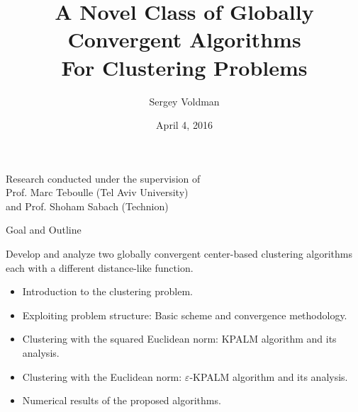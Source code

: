 \documentclass[9pt,handout]{beamer} %
\author[Sergey Voldman]{Sergey Voldman}
\newenvironment{displaybox}[1]
{
  \centerline\bgroup\hfill
  \begin{beamerboxesrounded}[lower=default,shadow=true,width=#1]{}
}
{
  \end{beamerboxesrounded}\hfill\egroup
}
\begin{document}
\title[Globally Convergent Algorithms for Clustering]{A Novel Class of Globally Convergent Algorithms \\ \vspace{0.1in} For Clustering Problems}
\date{April 4, 2016}

	\begin{frame}
		\titlepage
		\begin{center}
			Research conducted under the supervision of\\ \smallskip
			Prof. Marc Teboulle (Tel Aviv University)\\ \smallskip
			and Prof. Shoham Sabach (Technion)
		\end{center}
	\end{frame}

    \begin{frame}{Goal and Outline}

    	\begin{displaybox}{10cm}
    		\begin{center}
				Develop and analyze two globally convergent center-based clustering algorithms each with a different distance-like function.	        
        	\end{center}
        \end{displaybox}

        \vspace{0.03in}
        \pause
        \begin{itemize}[<+->]
        	\item Introduction to the clustering problem. \vspace{0.15in}
        	\item Exploiting problem structure: Basic scheme and convergence methodology. \vspace{0.15in}
            \item Clustering with the squared Euclidean norm: KPALM algorithm and its analysis. \vspace{0.15in}
            \item Clustering with the Euclidean norm: $\varepsilon$-KPALM algorithm and its analysis. \vspace{0.15in}
            \item Numerical results of the proposed algorithms.
        \end{itemize}
    \end{frame}
\end{document}
